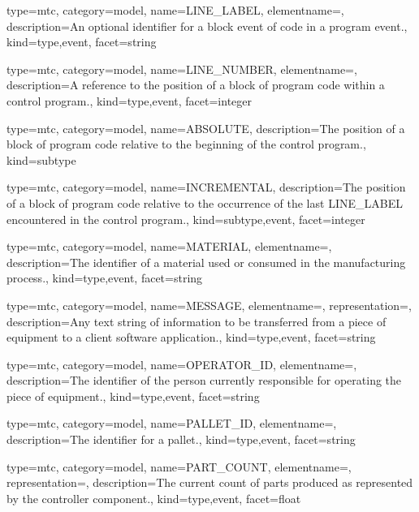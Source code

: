 {
  type=mtc,
  category=model,
  name={LINE\_LABEL},
  elementname=,
  description={An optional identifier for a \gls{block event} of code in a \gls{program event}.},
  kind={type,event},
  facet={\gls{string}}
}


{
  type=mtc,
  category=model,
  name={LINE\_NUMBER},
  elementname=,
  description={A reference to the position of a block of program code within a control program.},
  kind={type,event},
  facet={\gls{integer}}
}


{
  type=mtc,
  category=model,
  name={ABSOLUTE},
  description={The position of a block of program code relative to the beginning of the control program.},
  kind={subtype}
}


{
  type=mtc,
  category=model,
  name={INCREMENTAL},
  description={The position of a block of program code relative to the occurrence of the last LINE\_LABEL encountered in the control program.},
  kind={subtype,event},
  facet={\gls{integer}}
}


{
  type=mtc,
  category=model,
  name={MATERIAL},
  elementname=,
  description={The identifier of a material used or consumed in the manufacturing process.},
  kind={type,event},
  facet={\gls{string}}
}


{
  type=mtc,
  category=model,
  name={MESSAGE},
  elementname=,
  representation=,
  description={Any text string of information to be transferred from a piece of equipment to a client software application.},
  kind={type,event},
  facet={\gls{string}}
}


{
  type=mtc,
  category=model,
  name={OPERATOR\_ID},
  elementname=,
  description={The identifier of the person currently responsible for operating the piece of equipment.},
  kind={type,event},
  facet={\gls{string}}
}


{
  type=mtc,
  category=model,
  name={PALLET\_ID},
  elementname=,
  description={The identifier for a pallet.},
  kind={type,event},
  facet={\gls{string}}
}


{
  type=mtc,
  category=model,
  name={PART\_COUNT},
  elementname=,
  representation=,
  description={The current count of parts produced as represented by the \gls{controller} component.},
  kind={type,event},
  facet={\gls{float}}
}


